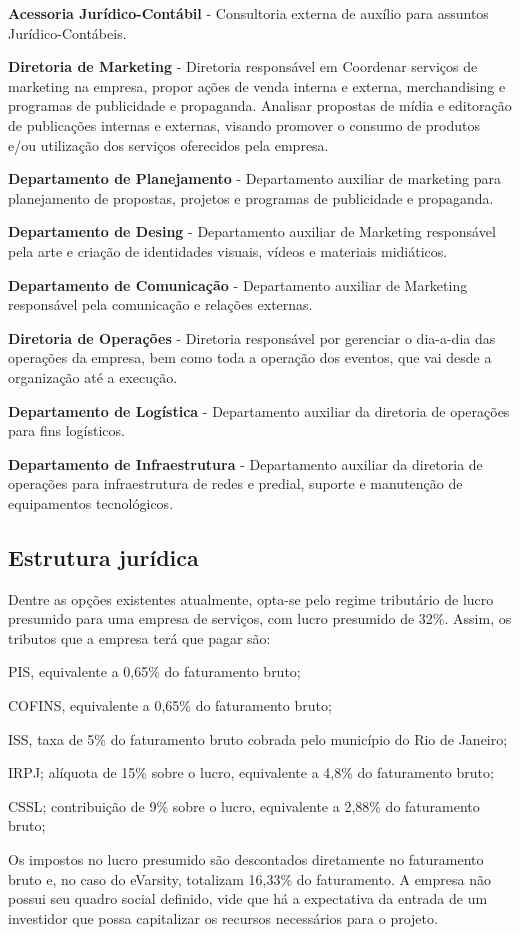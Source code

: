 \documentclass[a4paper, 12pt]{paper}
\begin{document}
\textbf{Acessoria Jur\'{i}dico-Cont\'{a}bil} - Consultoria externa de aux\'{i}lio para assuntos Jur\'{i}dico-Cont\'{a}beis.

\textbf{Diretoria de Marketing} -  Diretoria respons\'{a}vel em Coordenar serviços de marketing na empresa,  propor ações de venda interna e externa, merchandising e programas de publicidade e propaganda. Analisar propostas de mídia e editoração de publicações internas e externas, visando promover o consumo de produtos e/ou utilização dos serviços oferecidos pela empresa.

\textbf{Departamento de Planejamento} - Departamento auxiliar de marketing para planejamento de propostas, projetos e programas de publicidade e propaganda.

\textbf{Departamento de Desing} - Departamento auxiliar de Marketing respons\'{a}vel pela arte e cria\c{c}\~{a}o de identidades visuais, v\'{i}deos e materiais midi\'{a}ticos.

\textbf{Departamento de Comunica\c{c}\~{a}o} - Departamento auxiliar de Marketing respons\'{a}vel pela comunica\c{c}\~{a}o e rela\c{c}\~{o}es externas.

\textbf{Diretoria de Operações} - Diretoria respons\'{a}vel por gerenciar o dia-a-dia das operações da empresa, bem como toda a operação dos eventos, que vai desde a organização até a execução.


\textbf{Departamento de Log\'{i}stica} - Departamento auxiliar da diretoria de operações para fins log\'{i}sticos.

\textbf{Departamento de Infraestrutura} - Departamento auxiliar da diretoria de operações para infraestrutura de redes e predial, suporte e manuten\c{c}\~{a}o de equipamentos tecnol\'{o}gicos.

\subsection{Estrutura jurídica}
Dentre as opções existentes atualmente, opta-se pelo regime tributário de lucro presumido para uma empresa de serviços, com lucro presumido de 32\%. Assim, os tributos que a empresa terá que pagar são:

PIS, equivalente a 0,65\% do faturamento bruto;

COFINS, equivalente a 0,65\% do faturamento bruto;

ISS, taxa de 5\% do faturamento bruto cobrada pelo município do Rio de Janeiro;

IRPJ; alíquota de 15\% sobre o lucro, equivalente a 4,8\% do faturamento bruto;

CSSL; contribuição de 9\% sobre o lucro, equivalente a 2,88\% do faturamento bruto;

Os impostos no lucro presumido são descontados diretamente no faturamento bruto e, no caso do eVarsity, totalizam 16,33\% do faturamento. A empresa não possui seu quadro social definido, vide que há a expectativa da entrada de um investidor que possa capitalizar os recursos necessários para o projeto.
\end{document}
